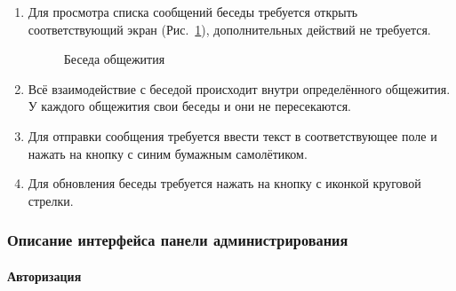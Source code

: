 \documentclass{../includes/TechDoc}
\begin{document}
    \begin{enumerate}
        \item Для просмотра списка сообщений беседы требуется открыть соответствующий экран (Рис.~\ref{fig:chat}), дополнительных действий не требуется.
        \begin{figure}[ht]
            \centering
            \caption{Беседа общежития}
            \label{fig:chat}
        \end{figure}

        \item Всё взаимодействие с беседой происходит внутри определённого общежития. У каждого общежития свои беседы и они не пересекаются.
        \item Для отправки сообщения требуется ввести текст в соответствующее поле и нажать на кнопку с синим бумажным самолётиком.
        \item Для обновления беседы требуется нажать на кнопку с иконкой круговой стрелки.
    \end{enumerate}

    \clearpage

    \subsubsection{Описание интерфейса панели администрирования}

    \paragraph{Авторизация}
\end{document}
